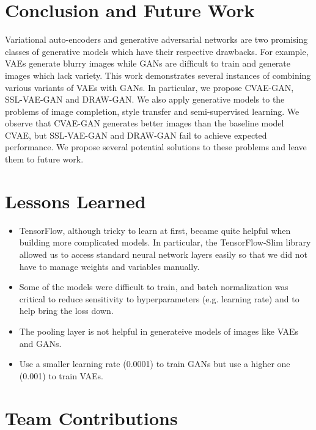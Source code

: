 \documentclass[10pt]{article}
\begin{document}
\section{Conclusion and Future Work}
Variational auto-encoders and generative adversarial networks are two promising classes of generative models which have their respective drawbacks. For example, VAEs generate blurry images while GANs are difficult to train and generate images which lack variety. This work demonstrates several instances of combining various variants of VAEs with GANs. In particular, we propose CVAE-GAN, SSL-VAE-GAN and DRAW-GAN. We also apply generative models to the problems of image completion, style transfer and semi-supervised learning. We observe that CVAE-GAN generates better images than the baseline model CVAE, but SSL-VAE-GAN and DRAW-GAN fail to achieve expected performance. We propose several potential solutions to these problems and leave them to future work.
\section{Lessons Learned}
\begin{itemize}
\item TensorFlow, although tricky to learn at first, became quite helpful when building more complicated models. In particular, the TensorFlow-Slim library allowed us to access standard neural network layers easily so that we did not have to manage weights and variables manually.

\item Some of the models were difficult to train, and batch normalization was critical to reduce sensitivity to hyperparameters (e.g. learning rate) and to help bring the loss down.
\item The pooling layer is not helpful in generateive models of images like VAEs and GANs.
\item Use a smaller learning rate (0.0001) to train GANs but use a higher one (0.001) to train VAEs.
\end{itemize}
\section{Team Contributions}
\end{document}
